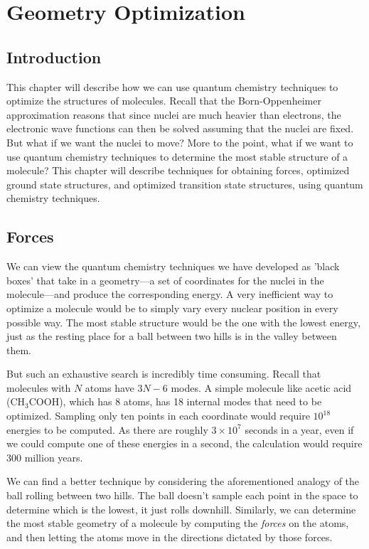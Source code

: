\chapter{Geometry Optimization}

\section{Introduction}
This chapter will describe how we can use quantum chemistry techniques
to optimize the structures of molecules. 
Recall that the Born-Oppenheimer approximation reasons that since
nuclei are much heavier than electrons, the electronic wave functions
can then be solved assuming that the nuclei are fixed. But what if we
want the nuclei to move? More to the point, what if we want to use
quantum chemistry techniques to determine the most stable structure of
a molecule? This chapter will describe techniques for obtaining
forces, optimized ground state structures, and optimized transition
state structures, using quantum chemistry techniques.

\section{Forces}
We can view the quantum chemistry techniques we have developed as
'black boxes' that take in a geometry---a set of coordinates for the
nuclei in the molecule---and produce the corresponding energy. A very
inefficient way to optimize a molecule would be to simply vary every
nuclear position in every possible way. The most stable structure
would be the one with the lowest energy, just as the resting place
for a ball between two hills is in the valley between them.

But such an exhaustive search is incredibly time consuming. Recall
that molecules with $N$ atoms have $3N-6$ modes. A simple molecule
like acetic acid (CH$_3$COOH), which has 8 atoms, has 18 internal
modes that need to be optimized. Sampling only ten points in each
coordinate would require $10^{18}$ energies to be computed. As there
are roughly $3\times10^7$ seconds in a year, even if we could compute
one of these energies in a second, the calculation would require 300
million years.

We can find a better technique by considering the aforementioned
analogy of the ball rolling between two hills. The ball doesn't sample
each point in the space to determine which is the lowest, it just
rolls downhill. Similarly, we can determine the most stable geometry
of a molecule by computing the \emph{forces} on the atoms, and then
letting the atoms move in the directions dictated by those forces.

